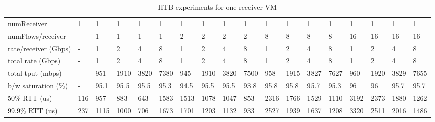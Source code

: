 \begin{table*}[!tb]
\centering
\tiny
{\setlength{\tabcolsep}{1pt}
\begin{tabular}{|l|l|llll|llll|llll|llll|}
\hline
numReceiver          & 1   & 1    & 1    & 1   & 1    & 1    & 1    & 1    & 1   & 1    & 1     & 1      & 1       & 1    & 1    & 1      & 1       \\
numFlows/receiver    & -   & 1    & 1    & 1   & 1    & 2    & 2    & 2    & 2   & 8    & 8     & 8      & 8       & 16   & 16   & 16     & 16      \\
rate/receiver (Gbps) & -   & 1    & 2    & 4   & 8    & 1    & 2    & 4    & 8   & 1    & 2     & 4      & 8       & 1    & 2    & 4      & 8       \\
total rate (Gbps)    & -   & 1    & 2    & 4   & 8    & 1    & 2    & 4    & 8   & 1    & 2     & 4      & 8       & 1    & 2    & 4      & 8       \\
\hline
total tput (mbps)    & -   & 951  & 1910 & 3820 & 7380  & 945  & 1910 & 3820 & 7500 & 958  & 1915  & 3827   & 7627    & 960  & 1920 & 3829   & 7655    \\
b/w saturation (\%)  & -   & 95.1 & 95.5 & 95.5 & 95.3  & 94.5 & 95.5 & 95.5 & 93.8 & 95.8 & 95.8  & 95.7   & 95.3    & 96   & 96   & 95.7   & 95.7 \\
\hline
50\% RTT (us)        & 116 & 957  & 883  & 643 & 1583 & 1513 & 1078 & 1047 & 853 & 2316 & 1766  & 1529   & 1110    & 3192 & 2373 & 1880   & 1262    \\
99.9\% RTT (us)      & 237 & 1115 & 1000 & 706 & 1673 & 1701 & 1203 & 1132 & 933 & 2527 & 1939  & 1637   & 1208    & 3320 & 2511 & 2016   & 1486   \\
\hline
\end{tabular}}
\caption{HTB experiments for one receiver VM}
\label{tbl:htb-1rec}
\end{table*}


